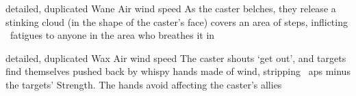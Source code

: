 \ifodd\value{diceNo}
  {detailed, duplicated}%
  {Wane}%
  {Air}%
  {wind speed}%
  {As the caster belches, they release a stinking cloud (in the shape of the caster's face) covers an area of  \glspl{step}, inflicting ~\glspl{fatigue} to anyone in the area who breathes it in}%
  {}

\else

  {detailed, duplicated}%
  {Wax}%
  {Air}%
  {wind speed}%
  {The caster shouts `get out', and  targets find themselves pushed back by whispy hands made of wind, stripping ~\glspl{ap} minus the targets' Strength.
  The hands avoid affecting the caster's allies}%
  {}

\fi
{}
